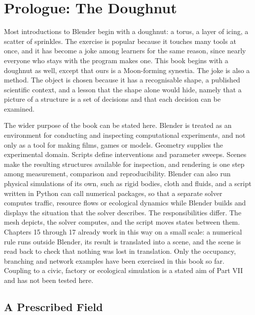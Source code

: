 \chapter*{Prologue: The Doughnut}

Most introductions to Blender begin with a doughnut: a torus, a layer of icing, a scatter of sprinkles. The exercise is popular because it touches many tools at once, and it has become a joke among learners for the same reason, since nearly everyone who stays with the program makes one. This book begins with a doughnut as well, except that ours is a Moon-forming synestia. The joke is also a method. The object is chosen because it has a recognisable shape, a published scientific context, and a lesson that the shape alone would hide, namely that a picture of a structure is a set of decisions and that each decision can be examined.

The wider purpose of the book can be stated here. Blender is treated as an environment for conducting and inspecting computational experiments, and not only as a tool for making films, games or models. Geometry supplies the experimental domain. Scripts define interventions and parameter sweeps. Scenes make the resulting structures available for inspection, and rendering is one step among measurement, comparison and reproducibility. Blender can also run physical simulations of its own, such as rigid bodies, cloth and fluids, and a script written in Python can call numerical packages, so that a separate solver computes traffic, resource flows or ecological dynamics while Blender builds and displays the situation that the solver describes. The responsibilities differ. The mesh depicts, the solver computes, and the script moves states between them. Chapters 15 through 17 already work in this way on a small scale: a numerical rule runs outside Blender, its result is translated into a scene, and the scene is read back to check that nothing was lost in translation. Only the occupancy, branching and network examples have been exercised in this book so far. Coupling to a civic, factory or ecological simulation is a stated aim of Part VII and has not been tested here.

\section*{A Prescribed Field}

